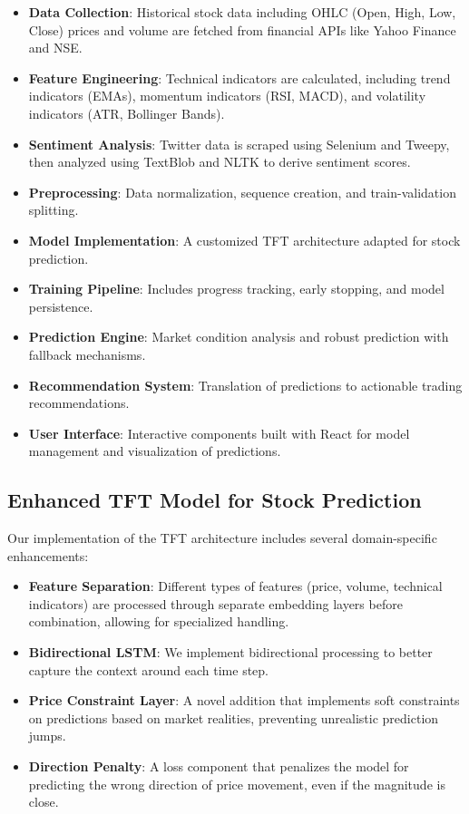 \documentclass[conference]{IEEEtran}
\begin{document}
\begin{itemize}
\item \textbf{Data Collection}: Historical stock data including OHLC (Open, High, Low, Close) prices and volume are fetched from financial APIs like Yahoo Finance and NSE.
\item \textbf{Feature Engineering}: Technical indicators are calculated, including trend indicators (EMAs), momentum indicators (RSI, MACD), and volatility indicators (ATR, Bollinger Bands).
\item \textbf{Sentiment Analysis}: Twitter data is scraped using Selenium and Tweepy, then analyzed using TextBlob and NLTK to derive sentiment scores.
\item \textbf{Preprocessing}: Data normalization, sequence creation, and train-validation splitting.
\item \textbf{Model Implementation}: A customized TFT architecture adapted for stock prediction.
\item \textbf{Training Pipeline}: Includes progress tracking, early stopping, and model persistence.
\item \textbf{Prediction Engine}: Market condition analysis and robust prediction with fallback mechanisms.
\item \textbf{Recommendation System}: Translation of predictions to actionable trading recommendations.
\item \textbf{User Interface}: Interactive components built with React for model management and visualization of predictions.
\end{itemize}

\subsection{Enhanced TFT Model for Stock Prediction}

Our implementation of the TFT architecture includes several domain-specific enhancements:

\begin{itemize}
\item \textbf{Feature Separation}: Different types of features (price, volume, technical indicators) are processed through separate embedding layers before combination, allowing for specialized handling.
\item \textbf{Bidirectional LSTM}: We implement bidirectional processing to better capture the context around each time step.
\item \textbf{Price Constraint Layer}: A novel addition that implements soft constraints on predictions based on market realities, preventing unrealistic prediction jumps.
\item \textbf{Direction Penalty}: A loss component that penalizes the model for predicting the wrong direction of price movement, even if the magnitude is close.
\end{itemize}
\end{document}
